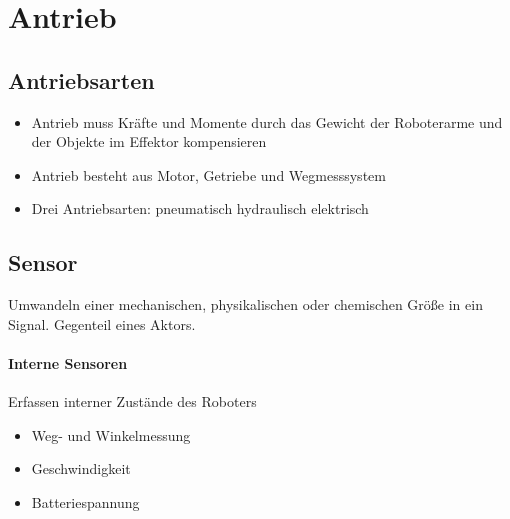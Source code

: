 \section{Antrieb}
\subsection{Antriebsarten}
\begin{itemize}
	\item Antrieb muss Kräfte und Momente durch das Gewicht der Roboterarme und der Objekte im Effektor kompensieren
	\item Antrieb besteht aus Motor, Getriebe und Wegmesssystem
	\item Drei Antriebsarten:
	\subitem pneumatisch
	\subitem hydraulisch
	\subitem elektrisch
\end{itemize}
\subsection{Sensor}
Umwandeln einer mechanischen, physikalischen oder chemischen Größe in ein Signal.
Gegenteil eines Aktors.
\paragraph{Interne Sensoren} Erfassen interner Zustände des Roboters
\begin{itemize}
	\item Weg- und Winkelmessung
	\item Geschwindigkeit
	\item Batteriespannung
\end{itemize}





















